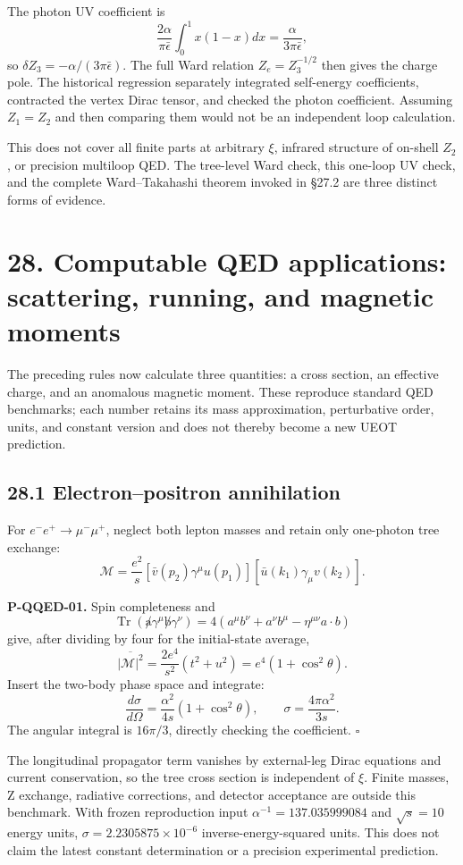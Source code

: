 \documentclass[
  11pt,
  oneside]{book}
\begin{document}
The photon UV coefficient is \[
\frac{2\alpha}{\pi\bar\epsilon}\int_0^1x(1-x)dx
=\frac{\alpha}{3\pi\bar\epsilon},
\] so \(\delta Z_3=-\alpha/(3\pi\bar\epsilon)\). The full Ward relation
\(Z_e=Z_3^{-1/2}\) then gives the charge pole. The historical regression
separately integrated self-energy coefficients, contracted the vertex
Dirac tensor, and checked the photon coefficient. Assuming \(Z_1=Z_2\)
and then comparing them would not be an independent loop calculation.

This does not cover all finite parts at arbitrary \(\xi\), infrared
structure of on-shell \(Z_2\), or precision multiloop QED. The
tree-level Ward check, this one-loop UV check, and the complete
Ward--Takahashi theorem invoked in §27.2 are three distinct forms of
evidence.

\chapter{28. Computable QED applications: scattering, running, and
magnetic moments}\label{ch-28}

The preceding rules now calculate three quantities: a cross section, an
effective charge, and an anomalous magnetic moment. These reproduce
standard QED benchmarks; each number retains its mass approximation,
perturbative order, units, and constant version and does not thereby
become a new UEOT prediction.

\section{28.1 Electron--positron annihilation}

For \(e^-e^+\to\mu^-\mu^+\), neglect both lepton masses and retain only
one-photon tree exchange: \[
\mathcal M=\frac{e^2}{s}
[\bar v(p_2)\gamma^\mu u(p_1)]
[\bar u(k_1)\gamma_\mu v(k_2)].
\] \label{p-qqed-01}{}

\textbf{P-QQED-01.} Spin completeness and \[
\operatorname{Tr}(\not a\gamma^\mu\not b\gamma^\nu)
=4(a^\mu b^\nu+a^\nu b^\mu-\eta^{\mu\nu}a\cdot b)
\] give, after dividing by four for the initial-state average, \[
\overline{|\mathcal M|^2}=\frac{2e^4}{s^2}(t^2+u^2)
=e^4(1+\cos^2\theta).
\] Insert the two-body phase space and integrate: \[
\frac{d\sigma}{d\Omega}=\frac{\alpha^2}{4s}(1+\cos^2\theta),
\qquad \sigma=\frac{4\pi\alpha^2}{3s}.
\] The angular integral is \(16\pi/3\), directly checking the
coefficient. \(\square\)

The longitudinal propagator term vanishes by external-leg Dirac
equations and current conservation, so the tree cross section is
independent of \(\xi\). Finite masses, Z exchange, radiative
corrections, and detector acceptance are outside this benchmark. With
frozen reproduction input \(\alpha^{-1}=137.035999084\) and
\(\sqrt s=10\) energy units, \(\sigma=2.2305875\times10^{-6}\)
inverse-energy-squared units. This does not claim the latest constant
determination or a precision experimental prediction.
\end{document}
